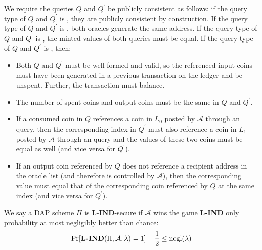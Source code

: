 \documentclass{llncs}
\begin{document}
We require the queries $Q$ and $Q^\prime$ be publicly consistent as follows: if the query type of $Q$ and $Q^\prime$ is , they are publicly consistent by construction.
If the query type of $Q$ and $Q^\prime$ is , both oracles generate the same address.
If the query type of $Q$ and $Q^\prime$ is , the minted values of both queries must be equal.
If the query type of $Q$ and $Q^\prime$ is , then:
\begin{itemize}
    \item Both $Q$ and $Q^\prime$ must be well-formed and valid, so the referenced input coins must have been generated in a previous transaction on the ledger and be unspent.
    Further, the transaction must balance.
    \item The number of spent coins and output coins must be the same in $Q$ and $Q^\prime$.
    \item If a consumed coin in $Q$ references a coin in $L_0$ posted by $\mathcal{A}$ through an  query, then the corresponding index in $Q^\prime$ must also reference a coin in $L_1$ posted by $\mathcal{A}$ through an  query and the values of these two coins must be equal as well (and vice versa for $Q^\prime$). 
    \item If an output coin referenced by $Q$ does not reference a recipient address in the oracle  list (and therefore is controlled by $\mathcal{A}$), then the corresponding value must equal that of the corresponding coin referenced by $Q$ at the same index (and vice versa for $Q^\prime$).
\end{itemize}

We say a DAP scheme $\Pi$ is $\textbf{L-IND}$-secure if $\mathcal{A}$ wins the game \textbf{L-IND} only probability at most negligibly better than chance:
$$\text{Pr}[\text{\textbf{L-IND}}(\Pi, \mathcal{A}, \lambda) = 1] - \frac{1}{2} \leq \text{negl}(\lambda)$$
\end{document}
